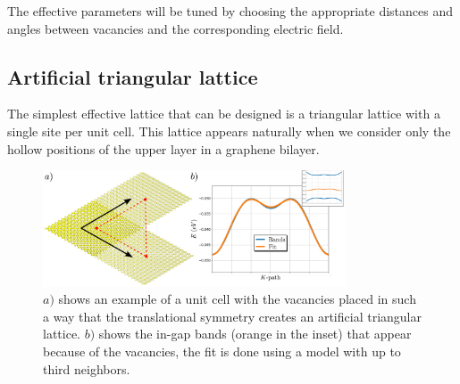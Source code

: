 The effective parameters will be tuned by choosing the appropriate distances and angles between vacancies and the corresponding electric field.


\subsection{Artificial triangular lattice}
The simplest effective lattice that can be designed is a triangular lattice with a single site per unit cell. This lattice appears naturally when we consider only the hollow positions of the upper layer in a graphene bilayer.

\begin{figure}[h!]
  \centering
  \includegraphics[width=0.8\textwidth]{artlat/fig/triangular_bands.pdf}
  \vspace{-5pt}
  \caption{$a)$ shows an example of a unit cell with the vacancies placed in such a way that the translational symmetry creates an artificial triangular lattice. $b)$ shows the in-gap bands (orange in the inset) that appear because of the vacancies, the fit is done using a model with up to third neighbors.}
  \label{triangular}
\end{figure}
\FloatBarrier


